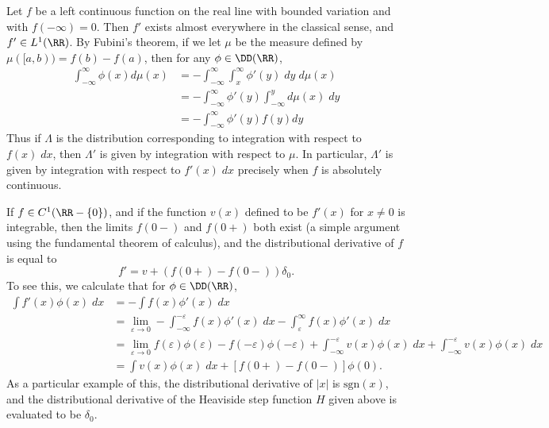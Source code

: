 \begin{example}
    Let $f$ be a left continuous function on the real line with bounded variation and with $f(-\infty) = 0$. Then $f'$ exists almost everywhere in the classical sense, and $f' \in L^1(\RR)$. By Fubini's theorem, if we let $\mu$ be the measure defined by $\mu([a,b)) = f(b) - f(a)$, then for any $\phi \in \DD(\RR)$,
    \begin{align*}
        \int_{-\infty}^\infty \phi(x) d\mu(x) &= - \int_{-\infty}^\infty \int_x^\infty \phi'(y)\; dy\; d\mu(x)\\
        &= - \int_{-\infty}^\infty \phi'(y) \int_{-\infty}^y d\mu(x)\; dy\\
        &= - \int_{-\infty}^\infty \phi'(y) f(y) dy
    \end{align*}
    Thus if $\Lambda$ is the distribution corresponding to integration with respect to $f(x)\; dx$, then $\Lambda'$ is given by integration with respect to $\mu$. In particular, $\Lambda'$ is given by integration with respect to $f'(x)\; dx$ precisely when $f$ is absolutely continuous.
\end{example}

\begin{example}
    If $f \in C^1(\RR - \{ 0 \})$, and if the function $v(x)$ defined to be $f'(x)$ for $x \neq 0$ is integrable, then the limits $f(0-)$ and $f(0+)$ both exist (a simple argument using the fundamental theorem of calculus), and the distributional derivative of $f$ is equal to
    \[ f' = v + (f(0+) - f(0-)) \delta_0. \]
    To see this, we calculate that for $\phi \in \DD(\RR)$,
    \begin{align*}
        \int f'(x) \phi(x)\; dx &= -\int f(x) \phi'(x)\; dx\\
        &= \lim_{\varepsilon \to 0} - \int_{-\infty}^{-\varepsilon} f(x) \phi'(x)\; dx - \int_\varepsilon^\infty f(x) \phi'(x)\; dx\\
        &= \lim_{\varepsilon \to 0} f(\varepsilon) \phi(\varepsilon) - f(-\varepsilon) \phi(-\varepsilon) + \int_{-\infty}^{-\varepsilon} v(x) \phi(x)\; dx + \int_{-\infty}^{-\varepsilon} v(x) \phi(x)\; dx\\
        &= \int v(x) \phi(x)\; dx + [f(0+) - f(0-)] \phi(0).
    \end{align*}
    As a particular example of this, the distributional derivative of $|x|$ is $\text{sgn}(x)$, and the distributional derivative of the Heaviside step function $H$ given above is evaluated to be $\delta_0$.
\end{example}

